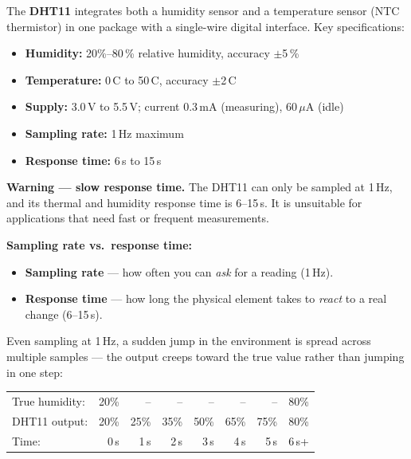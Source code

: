 \documentclass[12pt, a4paper]{article}
\newcommand{\warn}[1]{\textbf{\color{warnred}#1}}
\begin{document}
The \textbf{DHT11} integrates both a humidity sensor and a temperature sensor
(NTC thermistor) in one package with a single-wire digital interface.
Key specifications:

\begin{itemize}[leftmargin=1.5em]
  \item \textbf{Humidity:} 20\%--80\,\% relative humidity, accuracy $\pm$5\,\%
  \item \textbf{Temperature:} 0\,\textdegree{}C to 50\,\textdegree{}C,
        accuracy $\pm$2\,\textdegree{}C
  \item \textbf{Supply:} 3.0\,V to 5.5\,V; current 0.3\,mA (measuring),
        60\,$\mu$A (idle)
  \item \textbf{Sampling rate:} 1\,Hz maximum
  \item \textbf{Response time:} 6\,s to 15\,s
\end{itemize}

\begin{warnbox}
  \warn{Warning --- slow response time.} The DHT11 can only be sampled at
  1\,Hz, and its thermal and humidity response time is 6--15\,s. It is
  unsuitable for applications that need fast or frequent measurements.

  \medskip
  \textbf{Sampling rate vs.\ response time:}
  \begin{itemize}[leftmargin=1.5em, topsep=2pt]
    \item \textbf{Sampling rate} --- how often you can \emph{ask} for a reading (1\,Hz).
    \item \textbf{Response time} --- how long the physical element takes to
          \emph{react} to a real change (6--15\,s).
  \end{itemize}

  \medskip
  Even sampling at 1\,Hz, a sudden jump in the environment is spread across
  multiple samples --- the output creeps toward the true value rather than
  jumping in one step:

\begin{center}
\ttfamily\small
\begin{tabular}{lrrrrrrr}
True humidity: & 20\% & -- & -- & -- & -- & -- & 80\% \\
DHT11 output:  & 20\% & 25\% & 35\% & 50\% & 65\% & 75\% & 80\% \\
Time:          & 0\,s & 1\,s & 2\,s & 3\,s & 4\,s & 5\,s & 6\,s+ \\
\end{tabular}
\end{center}
\end{warnbox}
\end{document}
